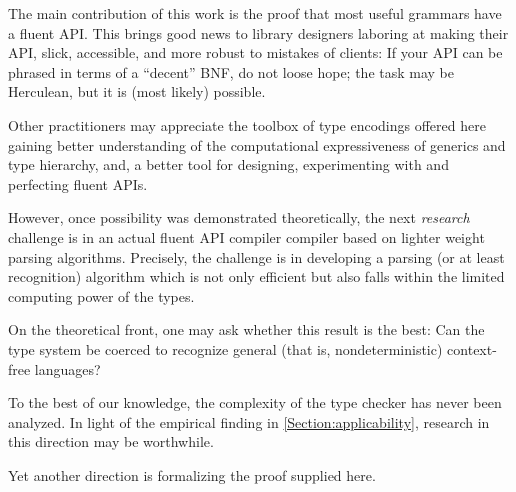 The main contribution of this work is the proof that 
  most useful grammars have a fluent API.
This brings good news to library designers laboring
  at making their API, slick, accessible, and more
  robust to mistakes of clients: 
If your API can be phrased in terms of a ``decent''
  BNF, do not loose hope; the task may be Herculean, but it is (most likely) possible. 

Other practitioners may appreciate the toolbox of type encodings offered here 
  gaining better understanding of the computational expressiveness of
  \Java generics and type hierarchy, and, a better tool
  for designing, experimenting with and perfecting fluent APIs.

However, once possibility was demonstrated theoretically, the next \emph{research} 
    challenge is in an actual fluent API compiler compiler based on lighter weight
  parsing algorithms.
Precisely, the challenge 
  is in developing a parsing (or at least recognition) 
  algorithm which is not only efficient but also falls within the limited computing power of the \Java types. 

On the theoretical front, one may ask whether 
  this result is the best:
Can the \Java type system be coerced to recognize
  general (that is, nondeterministic) context-free languages?

To the best of our knowledge, 
  the complexity of the \Java type checker has never been analyzed. 
In light of the empirical finding in \cref{Section:applicability},
  research in this direction may be worthwhile. 

Yet another direction is formalizing the proof supplied here. 





